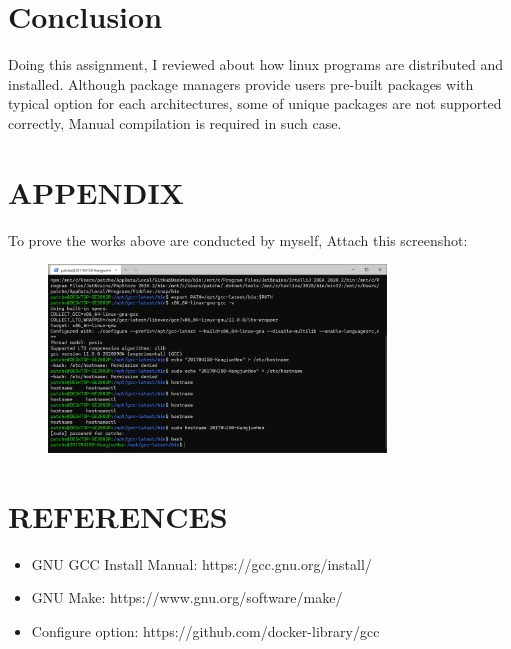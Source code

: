 \documentclass{article}
\begin{document}
\section{Conclusion}

Doing this assignment, I reviewed about how linux programs are distributed and installed.
Although package managers provide users pre-built packages with typical option for each architectures,
some of unique packages are not supported correctly, Manual compilation is required in such case.

\section*{APPENDIX}

To prove the works above are conducted by myself, Attach this screenshot:

\begin{figure}[!htbp]
    \centering
    \includegraphics[width=0.8\textwidth]{images/11.png}
\end{figure}


\section*{REFERENCES}

\begin{itemize}
    \item GNU GCC Install Manual: https://gcc.gnu.org/install/
    \item GNU Make: https://www.gnu.org/software/make/
    \item Configure option: https://github.com/docker-library/gcc
\end{itemize}
\end{document}
